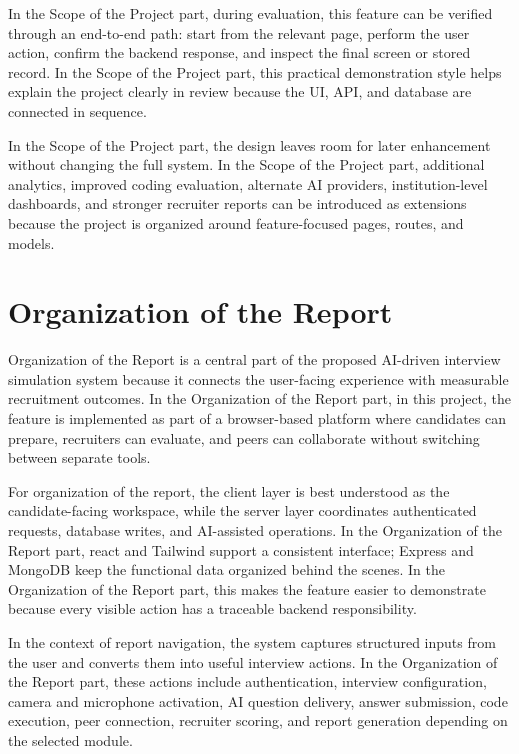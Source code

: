 \documentclass[12pt,a4paper]{report}
\begin{document}
In the Scope of the Project part, during evaluation, this feature can be verified through an end-to-end path: start from the relevant page, perform the user action, confirm the backend response, and inspect the final screen or stored record. In the Scope of the Project part, this practical demonstration style helps explain the project clearly in review because the UI, API, and database are connected in sequence.


In the Scope of the Project part, the design leaves room for later enhancement without changing the full system. In the Scope of the Project part, additional analytics, improved coding evaluation, alternate AI providers, institution-level dashboards, and stronger recruiter reports can be introduced as extensions because the project is organized around feature-focused pages, routes, and models.


\section{Organization of the Report}

Organization of the Report is a central part of the proposed AI-driven interview simulation system because it connects the user-facing experience with measurable recruitment outcomes. In the Organization of the Report part, in this project, the feature is implemented as part of a browser-based platform where candidates can prepare, recruiters can evaluate, and peers can collaborate without switching between separate tools.


For organization of the report, the client layer is best understood as the candidate-facing workspace, while the server layer coordinates authenticated requests, database writes, and AI-assisted operations. In the Organization of the Report part, react and Tailwind support a consistent interface; Express and MongoDB keep the functional data organized behind the scenes. In the Organization of the Report part, this makes the feature easier to demonstrate because every visible action has a traceable backend responsibility.


In the context of report navigation, the system captures structured inputs from the user and converts them into useful interview actions. In the Organization of the Report part, these actions include authentication, interview configuration, camera and microphone activation, AI question delivery, answer submission, code execution, peer connection, recruiter scoring, and report generation depending on the selected module.
\end{document}
